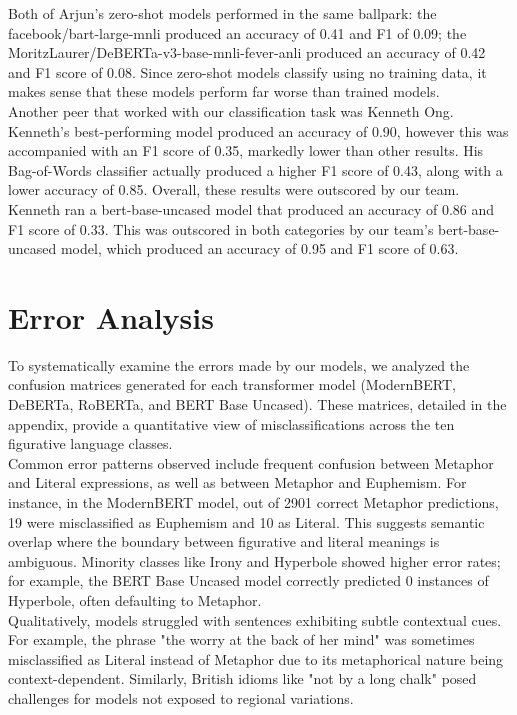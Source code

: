 \documentclass[11pt]{article}
\begin{document}
Both of Arjun's zero-shot models performed in the same ballpark: the facebook/bart-large-mnli produced an accuracy of 0.41 and F1 of 0.09; the MoritzLaurer/DeBERTa-v3-base-mnli-fever-anli produced an accuracy of 0.42 and F1 score of 0.08. Since zero-shot models classify using no training data, it makes sense that these models perform far worse than trained models. \\

Another peer that worked with our classification task was Kenneth Ong. Kenneth's best-performing model produced an accuracy of 0.90, however this was accompanied with an F1 score of 0.35, markedly lower than other results. His Bag-of-Words classifier actually produced a higher F1 score of 0.43, along with a lower accuracy of 0.85. Overall, these results were outscored by our team. \\

Kenneth ran a bert-base-uncased model that produced an accuracy of 0.86 and F1 score of 0.33. This was outscored in both categories by our team's bert-base-uncased model, which produced an accuracy of 0.95 and F1 score of 0.63. \\

\section{Error Analysis}

To systematically examine the errors made by our models, we analyzed the confusion matrices generated for each transformer model (ModernBERT, DeBERTa, RoBERTa, and BERT Base Uncased). These matrices, detailed in the appendix, provide a quantitative view of misclassifications across the ten figurative language classes. \\

Common error patterns observed include frequent confusion between Metaphor and Literal expressions, as well as between Metaphor and Euphemism. For instance, in the ModernBERT model, out of 2901 correct Metaphor predictions, 19 were misclassified as Euphemism and 10 as Literal. This suggests semantic overlap where the boundary between figurative and literal meanings is ambiguous. Minority classes like Irony and Hyperbole showed higher error rates; for example, the BERT Base Uncased model correctly predicted 0 instances of Hyperbole, often defaulting to Metaphor. \\

Qualitatively, models struggled with sentences exhibiting subtle contextual cues. For example, the phrase "the worry at the back of her mind" was sometimes misclassified as Literal instead of Metaphor due to its metaphorical nature being context-dependent. Similarly, British idioms like "not by a long chalk" posed challenges for models not exposed to regional variations. \\
\end{document}
